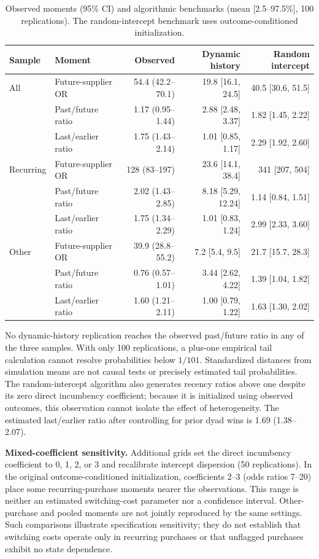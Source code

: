 \documentclass[11pt,a4paper]{article}
\newcommand{\botrule}{\bottomrule}
\begin{document}
\begin{table}[h]\centering\small
\caption{Observed moments (95\% CI) and algorithmic benchmarks (mean [2.5--97.5\%], 100 replications). The random-intercept benchmark uses outcome-conditioned initialization.}\label{tab:worlds}
\begin{tabular}{@{}llrrr@{}}
\toprule
Sample & Moment & Observed & Dynamic history & Random intercept\\
\midrule
All & Future-supplier OR & 54.4 (42.2--70.1) & 19.8 [16.1, 24.5] & 40.5 [30.6, 51.5]\\
 & Past/future ratio & 1.17 (0.95--1.44) & 2.88 [2.48, 3.37] & 1.82 [1.45, 2.22]\\
 & Last/earlier ratio & 1.75 (1.43--2.14) & 1.01 [0.85, 1.17] & 2.29 [1.92, 2.60]\\
Recurring & Future-supplier OR & 128 (83--197) & 23.6 [14.1, 38.4] & 341 [207, 504]\\
 & Past/future ratio & 2.02 (1.43--2.85) & 8.18 [5.29, 12.24] & 1.14 [0.84, 1.51]\\
 & Last/earlier ratio & 1.75 (1.34--2.29) & 1.01 [0.83, 1.24] & 2.99 [2.33, 3.60]\\
Other & Future-supplier OR & 39.9 (28.8--55.2) & 7.2 [5.4, 9.5] & 21.7 [15.7, 28.3]\\
 & Past/future ratio & 0.76 (0.57--1.01) & 3.44 [2.62, 4.22] & 1.39 [1.04, 1.82]\\
 & Last/earlier ratio & 1.60 (1.21--2.11) & 1.00 [0.79, 1.22] & 1.63 [1.30, 2.02]\\
\botrule
\end{tabular}
\end{table}

No dynamic-history replication reaches the observed past/future ratio in any of the three samples. With only 100 replications, a plus-one empirical tail calculation cannot resolve probabilities below $1/101$. Standardized distances from simulation means are not causal tests or precisely estimated tail probabilities. The random-intercept algorithm also generates recency ratios above one despite its zero direct incumbency coefficient; because it is initialized using observed outcomes, this observation cannot isolate the effect of heterogeneity. The estimated last/earlier ratio after controlling for prior dyad wins is 1.69 (1.38--2.07).

\textbf{Mixed-coefficient sensitivity.} Additional grids set the direct incumbency coefficient to 0, 1, 2, or 3 and recalibrate intercept dispersion (50 replications). In the original outcome-conditioned initialization, coefficients 2--3 (odds ratios 7--20) place some recurring-purchase moments nearer the observations. This range is neither an estimated switching-cost parameter nor a confidence interval. Other-purchase and pooled moments are not jointly reproduced by the same settings. Such comparisons illustrate specification sensitivity; they do not establish that switching costs operate only in recurring purchases or that unflagged purchases exhibit no state dependence.
\end{document}
